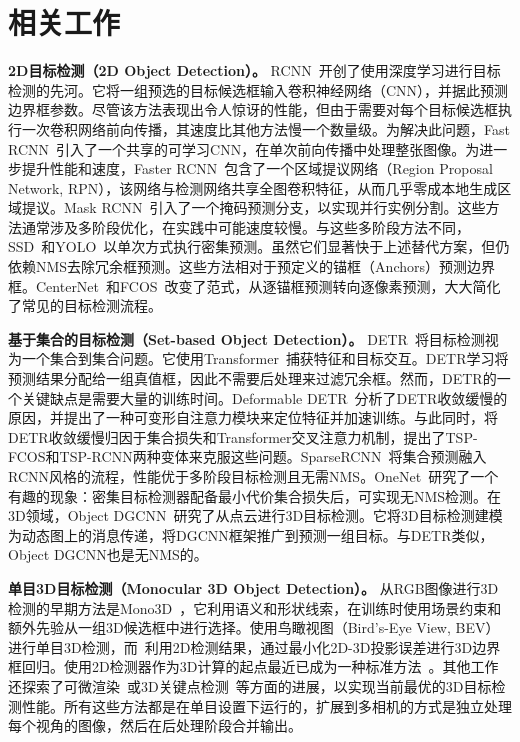 \section{相关工作}

\textbf{2D目标检测（2D Object Detection）。} RCNN~\cite{girshick2014rcnn}开创了使用深度学习进行目标检测的先河。它将一组预选的目标候选框输入卷积神经网络（CNN），并据此预测边界框参数。尽管该方法表现出令人惊讶的性能，但由于需要对每个目标候选框执行一次卷积网络前向传播，其速度比其他方法慢一个数量级。为解决此问题，Fast RCNN~\cite{ren2015faster}引入了一个共享的可学习CNN，在单次前向传播中处理整张图像。为进一步提升性能和速度，Faster RCNN~\cite{ren2015faster}包含了一个区域提议网络（Region Proposal Network, RPN），该网络与检测网络共享全图卷积特征，从而几乎零成本地生成区域提议。Mask RCNN~\cite{he2017maskrcnn}引入了一个掩码预测分支，以实现并行实例分割。这些方法通常涉及多阶段优化，在实践中可能速度较慢。与这些多阶段方法不同，SSD~\cite{liu2016ssd}和YOLO~\cite{Redmon2015YouOL}以单次方式执行密集预测。虽然它们显著快于上述替代方案，但仍依赖NMS去除冗余框预测。这些方法相对于预定义的锚框（Anchors）预测边界框。CenterNet~\cite{zhou2019centernet}和FCOS~\cite{tian2019fcos}改变了范式，从逐锚框预测转向逐像素预测，大大简化了常见的目标检测流程。

\textbf{基于集合的目标检测（Set-based Object Detection）。} DETR~\cite{detr}将目标检测视为一个集合到集合问题。它使用Transformer~\cite{Vaswani2017}捕获特征和目标交互。DETR学习将预测结果分配给一组真值框，因此不需要后处理来过滤冗余框。然而，DETR的一个关键缺点是需要大量的训练时间。Deformable DETR~\cite{zhu2021deformable}分析了DETR收敛缓慢的原因，并提出了一种可变形自注意力模块来定位特征并加速训练。与此同时，\cite{Sun2020RethinkingTS}将DETR收敛缓慢归因于集合损失和Transformer交叉注意力机制，提出了TSP-FCOS和TSP-RCNN两种变体来克服这些问题。SparseRCNN~\cite{peize2020sparse}将集合预测融入RCNN风格的流程，性能优于多阶段目标检测且无需NMS。OneNet~\cite{peize2020onenet}研究了一个有趣的现象：密集目标检测器配备最小代价集合损失后，可实现无NMS检测。在3D领域，Object DGCNN~\cite{objdgcnn}研究了从点云进行3D目标检测。它将3D目标检测建模为动态图上的消息传递，将DGCNN框架推广到预测一组目标。与DETR类似，Object DGCNN也是无NMS的。

\textbf{单目3D目标检测（Monocular 3D Object Detection）。} 从RGB图像进行3D检测的早期方法是Mono3D~\cite{chen2016monocular}，它利用语义和形状线索，在训练时使用场景约束和额外先验从一组3D候选框中进行选择。\cite{roddick2018orthographic}使用鸟瞰视图（Bird's-Eye View, BEV）进行单目3D检测，而~\cite{mousavian20173d}利用2D检测结果，通过最小化2D-3D投影误差进行3D边界框回归。使用2D检测器作为3D计算的起点最近已成为一种标准方法~\cite{kehl2017ssd,ku2019monocular}。其他工作还探索了可微渲染~\cite{beker2020monocular}或3D关键点检测~\cite{barabanau2019monocular,liu2020smoke,zhou2019centernet}等方面的进展，以实现当前最优的3D目标检测性能。所有这些方法都是在单目设置下运行的，扩展到多相机的方式是独立处理每个视角的图像，然后在后处理阶段合并输出。